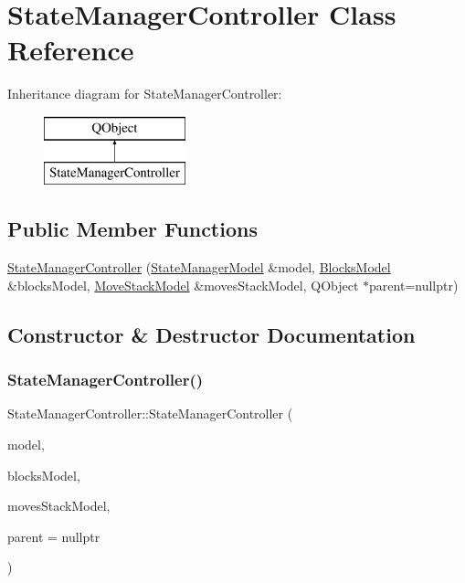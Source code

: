 \hypertarget{class_state_manager_controller}{}\section{State\+Manager\+Controller Class Reference}
\label{class_state_manager_controller}
Inheritance diagram for State\+Manager\+Controller\+:\begin{figure}[H]
\begin{center}
\leavevmode
\includegraphics[height=2.000000cm]{class_state_manager_controller}
\end{center}
\end{figure}
\subsection*{Public Member Functions}
\begin{DoxyCompactItemize}
\item 
\mbox{\hyperlink{class_state_manager_controller_a5c85e4844ad71a69c615bf3278956cda}{State\+Manager\+Controller}} (\mbox{\hyperlink{class_state_manager_model}{State\+Manager\+Model}} \&model, \mbox{\hyperlink{class_blocks_model}{Blocks\+Model}} \&blocks\+Model, \mbox{\hyperlink{class_move_stack_model}{Move\+Stack\+Model}} \&moves\+Stack\+Model, Q\+Object $\ast$parent=nullptr)
\end{DoxyCompactItemize}


\subsection{Constructor \& Destructor Documentation}
\mbox{\label{class_state_manager_controller_a5c85e4844ad71a69c615bf3278956cda}} 
\subsubsection{\texorpdfstring{StateManagerController()}{StateManagerController()}}
{\footnotesize\ttfamily State\+Manager\+Controller\+::\+State\+Manager\+Controller (\begin{DoxyParamCaption}\item[{\mbox{\hyperlink{class_state_manager_model}{State\+Manager\+Model}} \&}]{model,  }\item[{\mbox{\hyperlink{class_blocks_model}{Blocks\+Model}} \&}]{blocks\+Model,  }\item[{\mbox{\hyperlink{class_move_stack_model}{Move\+Stack\+Model}} \&}]{moves\+Stack\+Model,  }\item[{Q\+Object $\ast$}]{parent = {\ttfamily nullptr} }\end{DoxyParamCaption})\hspace{0.3cm}{\ttfamily [explicit]}}


